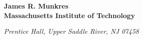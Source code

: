 \cleardoublepage
\thispagestyle{empty}
\vspace*{0.05\paperheight}

\begin{center}
\parbox{0.6\textwidth}{\raggedleft
{}
\par
\vspace{0.5cm}
\par
}
\end{center}

\vspace{6cm}

\begin{center}
\parbox{0.6\textwidth}{\raggedleft
{\fontsize{24}{30}\selectfont\bfseries James R. Munkres} \\
\vspace{0.1cm}
{\fontsize{16}{10}\selectfont\textbf{Massachusetts Institute of Technology}}\par
}
\end{center}

\vfill
\begin{center}
{\large\textsl{Prentice Hall, Upper Saddle River, NJ 07458}\par}
\end{center}
\clearpage
